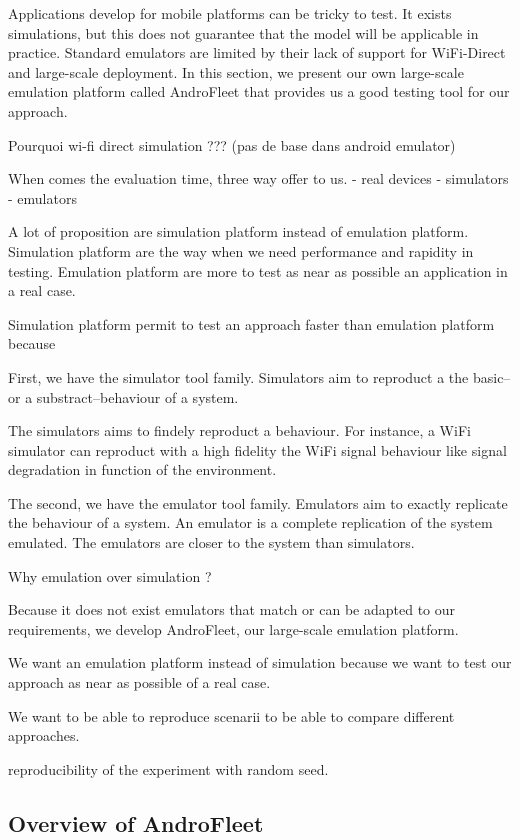 Applications develop for mobile platforms can be tricky to test.
It exists simulations, but this does not guarantee that the model will be applicable in practice.
Standard emulators are limited by their lack of support for WiFi-Direct and large-scale deployment.
In this section, we present our own large-scale emulation platform called AndroFleet that provides us a good testing tool for our approach.

Pourquoi wi-fi direct simulation ??? (pas de base dans android emulator)


When comes the evaluation time, three way offer to us.
- real devices
- simulators
- emulators

A lot of proposition are simulation platform instead of emulation platform.
Simulation platform are the way when we need performance and rapidity in testing.
Emulation platform are more to test as near as possible an application in a real case.


Simulation platform permit to test an approach faster than emulation platform because 

First, we have the simulator tool family.
Simulators aim to reproduct a the basic--or a substract--behaviour of a system.

The simulators aims to findely reproduct a behaviour.
For instance, a WiFi simulator can reproduct with a high fidelity the WiFi signal behaviour like signal degradation in function of the environment.

The second, we have the emulator tool family.
Emulators aim to exactly replicate the behaviour of a system.
An emulator is a complete replication of the system emulated.
The emulators are closer to the system than simulators.

Why emulation over simulation ?

Because it does not exist emulators that match or can be adapted to our requirements, we develop AndroFleet, our large-scale emulation platform.

We want an emulation platform instead of simulation because we want to test our approach as near as possible of a real case.

We want to be able to reproduce scenarii to be able to compare different approaches.


reproducibility of the experiment with random seed.


\subsection{Overview of AndroFleet}

